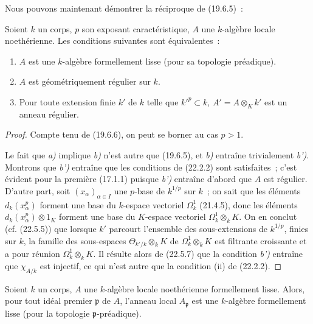 Nous pouvons maintenant démontrer la réciproque de (19.6.5)~:

\begin{theorem}[22.5.8]
\label{0.22.5.8-fr}
Soient $k$ un corps, $p$ son exposant caractéristique, $A$ une $k$-algèbre
locale noethérienne. Les conditions suivantes sont équivalentes~:
\begin{enumerate}
  \item[\textup{a)}] $A$ est une $k$-algèbre formellement lisse (pour sa topologie
  préadique).
  \item[\textup{b)}] $A$ est géométriquement régulier sur $k$.
  \item[\textup{b')}] Pour toute extension finie $k'$ de $k$ telle que $k'^p\subset k$,
  $A'=A\otimes_Kk'$ est un anneau régulier.
\end{enumerate}
\end{theorem}

\begin{proof}
Compte tenu de (19.6.6), on peut se borner au cas $p>1$.

Le fait que \emph{a)} implique \emph{b)} n'est autre que (19.6.5), et \emph{b)} entraîne
trivialement \emph{b')}. Montrons que \emph{b')} entraîne que les conditions de (22.2.2) sont
satisfaites~; c'est évident pour la première (17.1.1) puisque \emph{b')} entraîne
d'abord que $A$ est régulier. D'autre part, soit $(x_\alpha)_{\alpha\in I}$ une
$p$-base de $k^{1/p}$ sur $k$~; on sait que les éléments $d_k(x_\alpha^p)$
forment une base du $k$-espace vectoriel $\Omega^1_k$ (21.4.5), donc les
éléments $d_k(x_\alpha^p)\otimes1_K$ forment une base du $K$-espace vectoriel
$\Omega^1_k\otimes_kK$. On en conclut (cf. (22.5.5)) que lorsque $k'$ parcourt
l'ensemble des sous-extensions de $k^{1/p}$, finies sur $k$, la famille des
sous-espaces $\Theta_{k'/k}\otimes_kK$ de $\Omega^1_k\otimes_kK$ est filtrante
croissante et a pour réunion $\Omega^1_k\otimes_kK$. Il résulte alors de
(22.5.7) que la condition \emph{b')} entraîne que $\chi_{A/k}$ est injectif, ce qui
n'est autre que la condition (ii) de (22.2.2).
\end{proof}

\begin{corollary}[22.5.9]
\label{0.22.5.9-fr}
Soient $k$ un corps, $A$ une $k$-algèbre locale noethérienne formellement
lisse. Alors, pour tout idéal premier $\mathfrak p$ de $A$, l'anneau local
$A_{\mathfrak p}$ est une $k$-algèbre formellement lisse (pour la topologie
$\mathfrak p$-préadique).
\end{corollary}

